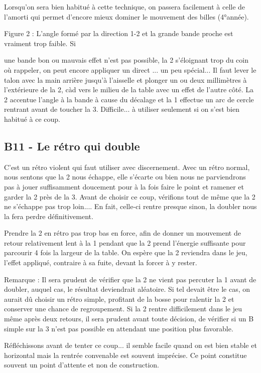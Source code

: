 Lorsqu'on sera bien habitué à cette technique, on passera facilement à
celle de l'amorti qui permet d'encore mieux dominer le mouvement des
billes (4°année).

Figure 2 : L'angle formé par la direction 1-2 et la grande bande proche
est vraiment trop faible. Si

une bande bon ou mauvais effet n'est pas possible, la 2 s'éloignant trop
du coin où rappeler, on peut encore appliquer un direct ... un peu
spécial... Il faut lever le talon avec la main arrière jusqu'à
l'aisselle et plonger un ou deux millimètres à l'extérieure de la 2, càd
vers le milieu de la table avec un effet de l'autre côté. La 2 accentue
l'angle à la bande à cause du décalage et la 1 effectue un arc de cercle
rentrant avant de toucher la 3. Difficile... à utiliser seulement si on
s'est bien habitué à ce coup.

\subsection{B11 - Le rétro qui double
}\label{b11---le-ruxe9tro-qui-double}

C'est un rétro violent qui faut utiliser avec discernement. Avec un
rétro normal, nous sentons que la 2 nous échappe, elle s'écarte ou bien
nous ne parviendrons pas à jouer suffisamment doucement pour à la fois
faire le point et ramener et garder la 2 près de la 3. Avant de choisir
ce coup, vérifions tout de même que la 2 ne s'échappe pas trop loin....
En fait, celle-ci rentre presque sinon, la doubler nous la fera perdre
définitivement.

Prendre la 2 en rétro pas trop bas en force, afin de donner un mouvement
de retour relativement lent à la 1 pendant que la 2 prend l'énergie
suffisante pour parcourir 4 fois la largeur de la table. On espère que
la 2 reviendra dans le jeu, l'effet appliqué, contraire à sa fuite,
devant la forcer à y rester.

Remarque : Il sera prudent de vérifier que la 2 ne vient pas percuter la
1 avant de doubler, auquel cas, le résultat deviendrait aléatoire. Si
tel devait être le cas, on aurait dû choisir un rétro simple, profitant
de la bosse pour ralentir la 2 et conserver une chance de regroupement.
Si la 2 rentre difficilement dans le jeu même après deux retours, il
sera prudent avant toute décision, de vérifier si un B simple sur la 3
n'est pas possible en attendant une position plus favorable.

Réfléchissons avant de tenter ce coup... il semble facile quand on est
bien stable et horizontal mais la rentrée convenable est souvent
imprécise. Ce point constitue souvent un point d'attente et non de
construction.

